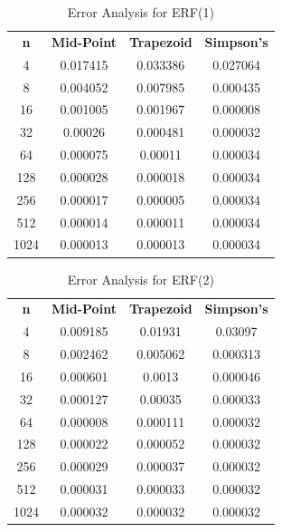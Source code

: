 \documentclass[titlepage, 11pt]{article}
\begin{document}
\begin{table}[]
    \centering
    \begin{tabular}{cccc}
        \textbf{n} & \textbf{Mid-Point} & \textbf{Trapezoid} & \textbf{Simpson's}   \\ 
       4 &	0.017415 & 0.033386	& 0.027064 \\
8&	0.004052 &	0.007985&	0.000435 \\
16 &	0.001005 & 0.001967	& 0.000008 \\
32&	0.00026 &	0.000481 &	0.000032 \\
64&	0.000075 &	0.00011 &	0.000034 \\
128&	0.000028	& 0.000018 &	0.000034 \\
256	&0.000017	&0.000005 &	0.000034 \\
512	&0.000014	&0.000011	&0.000034 \\
1024 &	0.000013&	0.000013&	0.000034 \\

    \end{tabular}
    \caption{Error Analysis for ERF(1)}
    \label{tab:Q21}
\end{table}

\begin{table}[]
    \centering
    \begin{tabular}{cccc}
        \textbf{n} & \textbf{Mid-Point} & \textbf{Trapezoid} & \textbf{Simpson's}   \\ 
    4& 0.009185&	0.01931&	0.03097 \\
8	& 0.002462	&0.005062&	0.000313\\
16	& 0.000601	& 0.0013	& 0.000046\\
32 &	0.000127 &	0.00035	& 0.000033\\
64 &	0.000008 &	0.000111 &	0.000032\\
128 &	0.000022 &	0.000052 &	0.000032\\
256	 &0.000029	& 0.000037	& 0.000032\\
512	& 0.000031	& 0.000033	& 0.000032\\
1024 & 0.000032 &	0.000032 &	0.000032\\

    \end{tabular}
    \caption{Error Analysis for ERF(2)}
    \label{tab:Q22}
\end{table}

\end{document}
